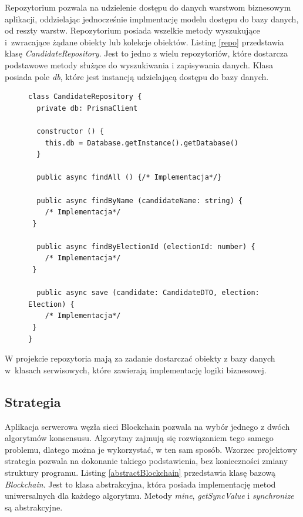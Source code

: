 \documentclass[a4paper,12pt]{book}
\begin{document}
Repozytorium pozwala na udzielenie dostępu do danych warstwom biznesowym aplikacji, oddzielając jednocześnie implmentację modelu dostępu do bazy danych, od reszty warstw. Repozytorium posiada wszelkie metody wyszukujące i~zwracające żądane obiekty lub kolekcje obiektów. Listing \ref{repo} przedstawia klasę \textit{CandidateRepository}. Jest to jedno z wielu repozytoriów, które dostarcza podstawowe metody służące do wyszukiwania i zapisywania danych. Klasa posiada pole \textit{db}, które jest instancją udzielającą dostępu do bazy danych.
\newpage
\begin{figure}  
  \centering
\begin{lstlisting}[style=ES6, caption={Klasa \textit{CandidateRepository}.}, label={repo}]
class CandidateRepository {
  private db: PrismaClient

  constructor () {
    this.db = Database.getInstance().getDatabase()
  }

  public async findAll () {/* Implementacja*/}

  public async findByName (candidateName: string) {
	/* Implementacja*/
 }

  public async findByElectionId (electionId: number) {
	/* Implementacja*/
 }

  public async save (candidate: CandidateDTO, election: Election) {
	/* Implementacja*/
 }
}
\end{lstlisting}
\end{figure}
W projekcie repozytoria mają za zadanie dostarczać obiekty z bazy danych w~klasach serwisowych, które zawierają implementację logiki biznesowej.

\subsection{Strategia}

Aplikacja serwerowa węzła sieci Blockchain pozwala na wybór jednego z dwóch algorytmów konsensusu. Algorytmy zajmują się rozwiązaniem tego samego problemu, dlatego można je wykorzystać, w ten sam sposób. Wzorzec projektowy strategia pozwala na dokonanie takiego podstawienia, bez konieczności zmiany struktury programu. Listing \ref{abstractBlockchain} przedstawia klasę bazową \textit{Blockchain}.
Jest to klasa abstrakcyjna, która posiada implementację metod uniwersalnych dla każdego algorytmu. Metody \textit{mine}, \textit{getSyncValue} i \textit{synchronize} są abstrakcyjne.
 
\end{document}
